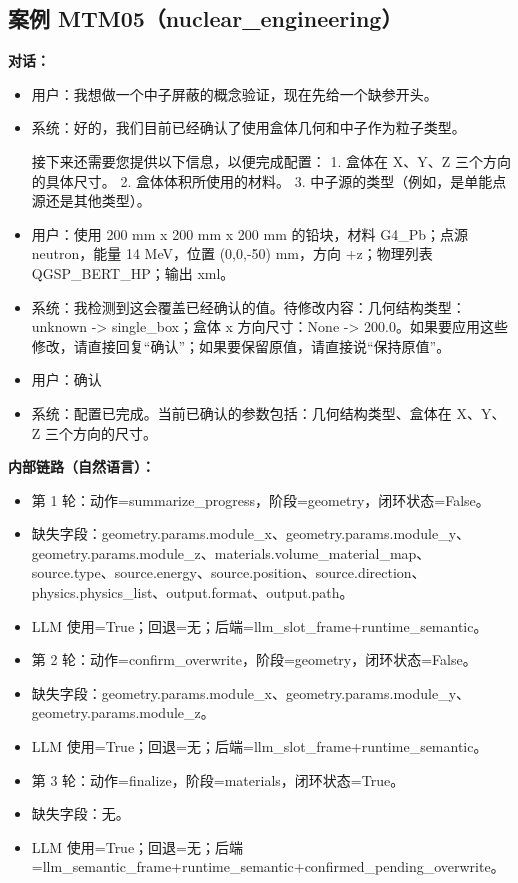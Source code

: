 \documentclass[11pt]{ctexart}
\begin{document}
\subsection{案例 MTM05（nuclear\_engineering）}
\textbf{对话：}
\begin{itemize}
\item 用户：我想做一个中子屏蔽的概念验证，现在先给一个缺参开头。
\item 系统：好的，我们目前已经确认了使用盒体几何和中子作为粒子类型。

接下来还需要您提供以下信息，以便完成配置：
1.  盒体在 X、Y、Z 三个方向的具体尺寸。
2.  盒体体积所使用的材料。
3.  中子源的类型（例如，是单能点源还是其他类型）。
\item 用户：使用 200 mm x 200 mm x 200 mm 的铅块，材料 G4\_Pb；点源 neutron，能量 14 MeV，位置 (0,0,-50) mm，方向 +z；物理列表 QGSP\_BERT\_HP；输出 xml。
\item 系统：我检测到这会覆盖已经确认的值。待修改内容：几何结构类型：unknown -> single\_box；盒体 x 方向尺寸：None -> 200.0。如果要应用这些修改，请直接回复“确认”；如果要保留原值，请直接说“保持原值”。
\item 用户：确认
\item 系统：配置已完成。当前已确认的参数包括：几何结构类型、盒体在 X、Y、Z 三个方向的尺寸。
\end{itemize}
\textbf{内部链路（自然语言）：}
\begin{itemize}
\item 第 1 轮：动作=summarize\_progress，阶段=geometry，闭环状态=False。
\item 缺失字段：geometry.params.module\_x、geometry.params.module\_y、geometry.params.module\_z、materials.volume\_material\_map、source.type、source.energy、source.position、source.direction、physics.physics\_list、output.format、output.path。
\item LLM 使用=True；回退=无；后端=llm\_slot\_frame+runtime\_semantic。
\item 第 2 轮：动作=confirm\_overwrite，阶段=geometry，闭环状态=False。
\item 缺失字段：geometry.params.module\_x、geometry.params.module\_y、geometry.params.module\_z。
\item LLM 使用=True；回退=无；后端=llm\_slot\_frame+runtime\_semantic。
\item 第 3 轮：动作=finalize，阶段=materials，闭环状态=True。
\item 缺失字段：无。
\item LLM 使用=True；回退=无；后端=llm\_semantic\_frame+runtime\_semantic+confirmed\_pending\_overwrite。
\end{itemize}
\end{document}
